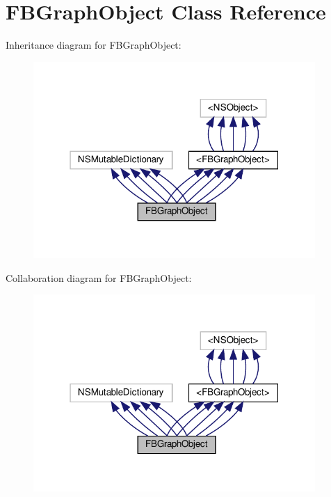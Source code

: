 \hypertarget{interfaceFBGraphObject}{}\section{F\+B\+Graph\+Object Class Reference}
\label{interfaceFBGraphObject}


Inheritance diagram for F\+B\+Graph\+Object\+:
\nopagebreak
\begin{figure}[H]
\begin{center}
\leavevmode
\includegraphics[width=304pt]{interfaceFBGraphObject__inherit__graph}
\end{center}
\end{figure}


Collaboration diagram for F\+B\+Graph\+Object\+:
\nopagebreak
\begin{figure}[H]
\begin{center}
\leavevmode
\includegraphics[width=304pt]{interfaceFBGraphObject__coll__graph}
\end{center}
\end{figure}
